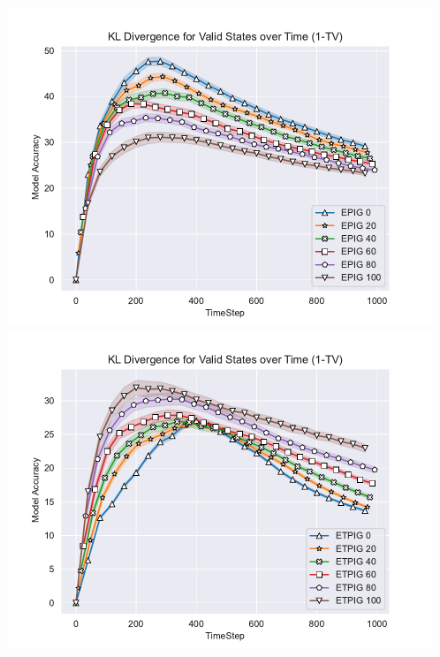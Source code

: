 \documentclass[12pt]{thesis}
\begin{document}
\begin{figure}[p]
	\includegraphics[scale=0.5]{"images/Epsilon_Model_Accuracy_EPIG_1-TV.pdf"}
	\includegraphics[scale=0.5]{"images/Epsilon_Model_Accuracy_ETPIG_1-TV.pdf"}
	

\end{figure}
\end{document}
